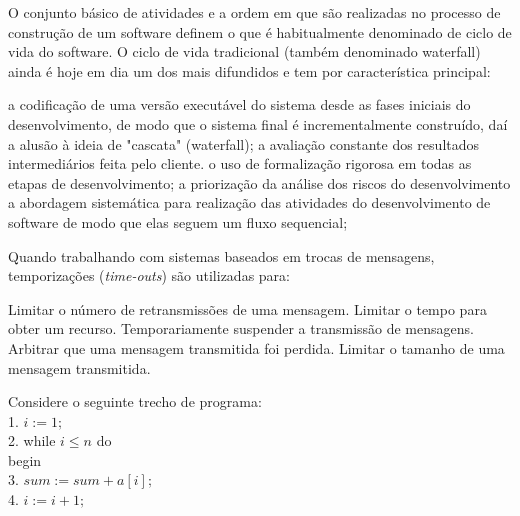 \documentclass[12pt, addpoints]{exam}
\begin{document}
    \begin{questions}

    \newpage
    \question

O conjunto básico de atividades e a ordem em que são realizadas no processo de construção de um software definem o que é habitualmente denominado de ciclo de vida do software. O ciclo de vida tradicional (também denominado waterfall) ainda é hoje em dia um dos mais difundidos e tem por característica principal: 
\begin{choices}
\choice a codificação de uma versão executável do sistema desde as fases iniciais do desenvolvimento, de modo que o sistema final é incrementalmente construído, daí a alusão à ideia de "cascata" (waterfall); 
\choice a avaliação constante dos resultados intermediários feita pelo cliente.
\choice o uso de formalização rigorosa em todas as etapas de desenvolvimento; 
\choice a priorização da análise dos riscos do desenvolvimento
\choice a abordagem sistemática para realização das atividades do desenvolvimento de software de modo que elas seguem um fluxo sequencial; 
\end{choices}

\question

Quando trabalhando com sistemas baseados em trocas de mensagens, temporizações (\textit{time-outs}) são utilizadas para:


\begin{choices}
\choice Limitar o número de retransmissões de uma mensagem.
\choice Limitar o tempo para obter um recurso.
\choice Temporariamente suspender a transmissão de mensagens.
\choice Arbitrar que uma mensagem transmitida foi perdida.
\choice Limitar o tamanho de uma mensagem transmitida.
\end{choices}

\question

Considere o seguinte trecho de programa:\\

1. \( i := 1; \)\\

2. while \( i \leq n \) do\\

   begin\\

3. \( sum := sum + a[i]; \)\\

4. \( i := i + 1; \)\\


\end{questions}
\end{document}
